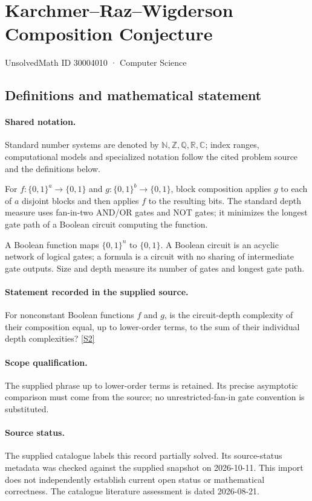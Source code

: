 \documentclass[11pt]{article}
\newcommand{\sref}[2]{\hyperlink{source:#1:#2}{[S#2]}}
\begin{document}
\setcounter{section}{30004009}
\section{Karchmer–Raz–Wigderson Composition Conjecture}\label{30004010}
{\small\sffamily UnsolvedMath ID 30004010 · Computer Science}
\subsection{Definitions and mathematical statement}

\paragraph{Shared notation.}Standard number systems are denoted by $\mathbb N,\mathbb Z,\mathbb Q,\mathbb R,\mathbb C$; index ranges, computational models and specialized notation follow the cited problem source and the definitions below.


For $f:\{0,1\}^a\to\{0,1\}$ and $g:\{0,1\}^b\to\{0,1\}$, block composition applies $g$ to each of $a$ disjoint blocks and then applies $f$ to the resulting bits. The standard depth measure uses fan-in-two AND/OR gates and NOT gates; it minimizes the longest gate path of a Boolean circuit computing the function.

A Boolean function maps $\{0,1\}^n$ to $\{0,1\}$. A Boolean circuit is an acyclic network of logical gates; a formula is a circuit with no sharing of intermediate gate outputs. Size and depth measure its number of gates and longest gate path.
\paragraph{Statement recorded in the supplied source.}
For nonconstant Boolean functions $f$ and $g$, is the circuit-depth complexity of their composition equal, up to lower-order terms, to the sum of their individual depth complexities? \sref{30004010}{2}
\paragraph{Scope qualification.}
The supplied phrase up to lower-order terms is retained. Its precise asymptotic comparison must come from the source; no unrestricted-fan-in gate convention is substituted.
\paragraph{Source status.}
The supplied catalogue labels this record partially solved. Its source-status metadata was checked against the supplied snapshot on 2026-10-11. This import does not independently establish current open status or mathematical correctness. The catalogue literature assessment is dated 2026-08-21.
\end{document}
